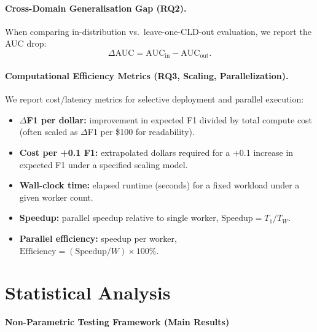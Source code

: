 \paragraph{Cross-Domain Generalisation Gap (RQ2).}
When comparing in-distribution vs.\ leave-one-CLD-out evaluation, we report the AUC drop:
\begin{equation}
    \Delta \text{AUC} = \text{AUC}_{\text{in}} - \text{AUC}_{\text{out}}.
\end{equation}

\paragraph{Computational Efficiency Metrics (RQ3, Scaling, Parallelization).}
We report cost/latency metrics for selective deployment and parallel execution:
\begin{itemize}[noitemsep]
    \item \textbf{$\Delta$F1 per dollar:} improvement in expected F1 divided by total compute cost (often scaled as $\Delta$F1 per \$100 for readability).
    \item \textbf{Cost per +0.1 F1:} extrapolated dollars required for a +0.1 increase in expected F1 under a specified scaling model.
    \item \textbf{Wall-clock time:} elapsed runtime (seconds) for a fixed workload under a given worker count.
    \item \textbf{Speedup:} parallel speedup relative to single worker, $\text{Speedup} = T_1/T_W$.
    \item \textbf{Parallel efficiency:} speedup per worker, $\text{Efficiency} = (\text{Speedup}/W)\times 100\%$.
\end{itemize}

\section{Statistical Analysis}

\noindent\textbf{Non-Parametric Testing Framework (Main Results)}
\label{sec:nonparam_framework}

